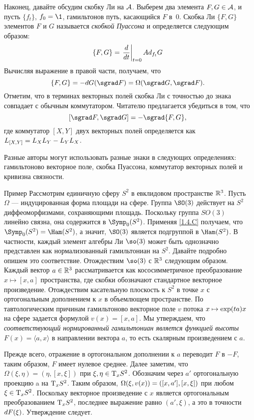 {Наконец, давайте обсудим скобку Ли на $\mathcal{A}$.
Выберем два элемента $F,G \in \mathcal{A}$, и пусть $\{f_t\}$, $f_0 = \1$, гамильтонов путь, касающийся $F$ в~$0$.
Скобка Ли $\{F, G\}$ элементов $F$ и $G$ называется \emph{скобкой Пуассона} и определяется следующим образом: 
\[\{F, G\}=\left.\frac{d}{d t}\right|_{t=0}Ad_{f_t}G\]
Вычисляя выражение в правой части, получаем, что 
\[\{F, G\} = -\d G (\sgrad F) = \Omega (\sgrad G, \sgrad F).\]
Отметим, что в терминах векторных полей скобка Ли с точностью до знака совпадает с обычным коммутатором.
Читателю предлагается убедиться в том, что 
\[[\sgrad F, \sgrad G] = -\sgrad  \{F, G\},\]
где коммутатор $[X, Y]$ двух векторных полей определяется как $L_{[X, Y]} \z= L_X L_Y -L_Y L_X$.

\begin{framed}
 Разные авторы могут использовать разные
знаки в следующих определениях:
гамильтоново векторное поле,
скобка Пуассона,
коммутатор векторных полей
и кривизна связности.
\end{framed}

\begin{ex}{Пример}\label{1.4.H}
Рассмотрим единичную сферу $S^2$ в евклидовом пространстве $\mathbb{R}^3$.
Пусть $\Omega$ — индуцированная форма площади на сфере.
Группа $\SO(3)$ действует на $S^2$ диффеоморфизмами, сохраняющими площадь.
Поскольку группа $SO(3)$ линейно связна, она содержится в $\Symp_0 (S^2)$.
Применяя \ref{1.4.C} получаем, что $\Symp_0 (S^2) \z= \Ham (S^2)$, а значит, $\SO (3)$ является подгруппой в $\Ham (S^2)$.
В частности, каждый элемент алгебры Ли $\so(3)$ может быть однозначно представлен как нормализованный гамильтониан на $S^2$.
Давайте подробно опишем это соответствие.
Отождествим $\so (3)$ с $\mathbb{R}^3$ следующим образом.
Каждый вектор $a \in \mathbb{R}^3$ рассматривается как кососимметричное преобразование $x \mapsto [x, a]$ пространства, где скобки обозначают стандартное векторное произведение.
Отождествим касательную плоскость к $S^2$ в точке $x$ с ортогональным
дополнением к $x$ в объемлющем пространстве.
По тавтологическим причинам гамильтоново векторное поле $v$ потока $x \z\mapsto \exp (ta) x$ на сфере задается формулой $v (x) = [x, a]$.
Мы утверждаем, что \textit{соответствующий нормированный гамильтониан является
функцией высоты $F(x)=\langle a,x\rangle$} в направлении вектора $a$, то есть скалярным произведением с $a$.

Прежде всего, отражение в ортогональном дополнении к $a$ переводит $F$ в $-F$, таким образом, $F$ имеет нулевое среднее.
Далее заметим, что $\Omega (\xi, \eta) = (\eta, [x, \xi])$ при $\xi, \eta \in \mathrm{T}_x S^2$.
Обозначим через $a'$ ортогональную проекцию a на $\mathrm{T}_x S^2$.
Таким образом, $\Omega (\xi, v(x)) \z= ([x, a'], [x, \xi])$ при любом $\xi \in \mathrm{T}_x S^2$.
Поскольку векторное произведение с $x$ является ортогональным преобразованием $\mathrm{T}_x S^2$, последнее выражение равно $(a', \xi)$,
а это в точности $d F(\xi)$.
Утверждение следует.
\end{ex}

}
